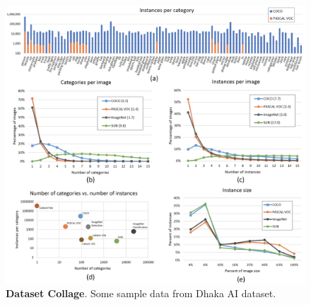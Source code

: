\begin{figure}[H] %
  \centering
  \includegraphics[width=\textwidth]{figures/paper/coco-details.png}
  \caption[Dataset Collage]{\textbf{Dataset Collage}. Some sample data from Dhaka AI dataset.}
  \label{fig:figures/paper/coco-details.png}
\end{figure}



